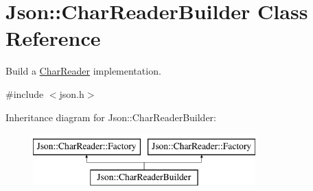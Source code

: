 \hypertarget{class_json_1_1_char_reader_builder}{}\section{Json\+:\+:Char\+Reader\+Builder Class Reference}
\label{class_json_1_1_char_reader_builder}


Build a \hyperlink{class_json_1_1_char_reader}{Char\+Reader} implementation.  




{\ttfamily \#include $<$json.\+h$>$}

Inheritance diagram for Json\+:\+:Char\+Reader\+Builder\+:\begin{figure}[H]
\begin{center}
\leavevmode
\includegraphics[height=2.000000cm]{class_json_1_1_char_reader_builder}
\end{center}
\end{figure}
